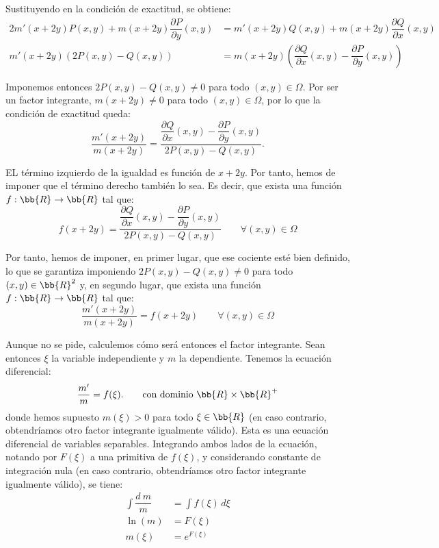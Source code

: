 \documentclass[12pt]{article}
\begin{document}
\begin{ejercicio}
        Sustituyendo en la condición de exactitud, se obtiene:
        \begin{align*}
            2m'(x + 2y)P(x,y) + m(x + 2y)\dfrac{\partial P}{\partial y}(x,y) &= m'(x + 2y)Q(x,y) + m(x + 2y)\dfrac{\partial Q}{\partial x}(x,y)\\
            m'(x + 2y)(2P(x,y) - Q(x,y)) &= m(x + 2y)\left(\dfrac{\partial Q}{\partial x}(x,y) - \dfrac{\partial P}{\partial y}(x,y)\right)
        \end{align*}

        Imponemos entonces $2P(x,y) - Q(x,y) \neq 0$ para todo $(x, y) \in \Omega$. Por ser un factor integrante, $m(x + 2y) \neq 0$ para todo $(x, y) \in \Omega$, por lo que la condición de exactitud queda:
        \begin{equation*}
            \dfrac{m'(x + 2y)}{m(x + 2y)} = \dfrac{\dfrac{\partial Q}{\partial x}(x,y) - \dfrac{\partial P}{\partial y}(x,y)}{2P(x,y) - Q(x,y)}.
        \end{equation*}

        EL término izquierdo de la igualdad es función de $x + 2y$. Por tanto, hemos de imponer que el término derecho también lo sea. Es decir, que exista una función $f : \bb{R} \to \bb{R}$ tal que:
        \begin{equation*}
            f(x + 2y) = \dfrac{\dfrac{\partial Q}{\partial x}(x,y) - \dfrac{\partial P}{\partial y}(x,y)}{2P(x,y) - Q(x,y)} \qquad \forall (x, y) \in \Omega
        \end{equation*}

        Por tanto, hemos de imponer, en primer lugar, que ese cociente esté bien definido, lo que se garantiza imponiendo $2P(x,y) - Q(x,y) \neq 0$ para todo $(x, y) \in \bb{R}^2$ y, en segundo lugar, que exista una función $f : \bb{R} \to \bb{R}$ tal que:
        \begin{equation*}
            \dfrac{m'(x+2y)}{m(x+2y)} = f(x+2y) \qquad \forall (x, y) \in \Omega
        \end{equation*}

        Aunque no se pide, calculemos cómo será entonces el factor integrante.
        Sean entonces $\xi$ la variable independiente y $m$ la dependiente. Tenemos la ecuación diferencial:
        \begin{equation*}
            \dfrac{m'}{m} = f(\xi).\qquad \text{con dominio } \bb{R}\times \bb{R}^+
        \end{equation*}
        donde hemos supuesto $m(\xi) > 0$ para todo $\xi \in \bb{R}$ (en caso contrario, obtendríamos otro factor integrante igualmente válido).
        Esta es una ecuación diferencial de variables separables. Integrando ambos lados de la ecuación, notando por $F(\xi)$ a una primitiva de $f(\xi)$, y considerando constante de integración nula (en caso contrario, obtendríamos otro factor integrante igualmente válido), se tiene:
        \begin{align*}
            \int \dfrac{d\ m}{m} &= \int f(\xi)\,d\xi\\
            \ln(m) &= F(\xi)\\
            m(\xi) &= e^{F(\xi)}
        \end{align*}


\end{ejercicio}
\end{document}
